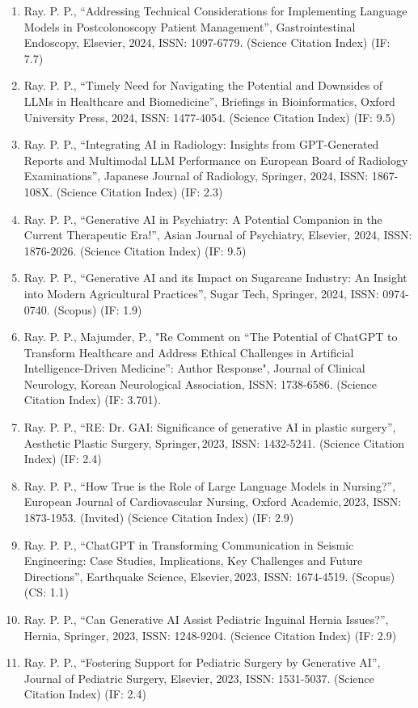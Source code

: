 \documentclass[11pt,a4paper]{moderncv}
\begin{document}
\begin{adjustwidth}{6em}{0pt}
\begin{enumerate}
		\item Ray. P. P., “Addressing Technical Considerations for Implementing Language Models in Postcolonoscopy Patient Management”, Gastrointestinal Endoscopy, Elsevier, 2024, ISSN: 1097-6779. (Science Citation Index) (IF: 7.7)
		\item Ray. P. P., “Timely Need for Navigating the Potential and Downsides of LLMs in Healthcare and Biomedicine”, Briefings in Bioinformatics, Oxford University Press, 2024, ISSN: 1477-4054. (Science Citation Index) (IF: 9.5)
		\item Ray. P. P., “Integrating AI in Radiology: Insights from GPT-Generated Reports and Multimodal LLM Performance on European Board of Radiology Examinations”, Japanese Journal of Radiology, Springer, 2024, ISSN: 1867-108X. (Science Citation Index) (IF: 2.3)
		\item Ray. P. P., “Generative AI in Psychiatry: A Potential Companion in the Current Therapeutic Era!”, Asian Journal of Psychiatry, Elsevier, 2024, ISSN: 1876-2026. (Science Citation Index) (IF: 9.5)
		\item Ray. P. P., “Generative AI and its Impact on Sugarcane Industry: An Insight into Modern Agricultural Practices”, Sugar Tech, Springer, 2024, ISSN: 0974-0740. (Scopus) (IF: 1.9)
		\item Ray. P. P., Majumder, P., "Re Comment on “The Potential of ChatGPT to Transform Healthcare and Address Ethical Challenges in Artificial Intelligence-Driven Medicine”: Author Response", Journal of Clinical Neurology, Korean Neurological Association, ISSN: 1738-6586. (Science Citation Index) (IF: 3.701).
		\item Ray. P. P., “RE: Dr. GAI: Significance of generative AI in plastic surgery”, Aesthetic Plastic Surgery, Springer, 2023, ISSN: 1432-5241. (Science Citation Index) (IF: 2.4)
		\item Ray. P. P., “How True is the Role of Large Language Models in Nursing?”, European Journal of Cardiovascular Nursing, Oxford Academic, 2023, ISSN: 1873-1953. (Invited) (Science Citation Index) (IF: 2.9)
		\item Ray. P. P., “ChatGPT in Transforming Communication in Seismic Engineering: Case Studies, Implications, Key Challenges and Future Directions”, Earthquake Science, Elsevier, 2023, ISSN: 1674-4519. (Scopus) (CS: 1.1)
		\item Ray. P. P., “Can Generative AI Assist Pediatric Inguinal Hernia Issues?”, Hernia, Springer, 2023, ISSN: 1248-9204. (Science Citation Index) (IF: 2.9)
		\item Ray. P. P., “Fostering Support for Pediatric Surgery by Generative AI”, Journal of Pediatric Surgery, Elsevier, 2023, ISSN: 1531-5037. (Science Citation Index) (IF: 2.4)

\end{enumerate}
\end{adjustwidth}
\end{document}
